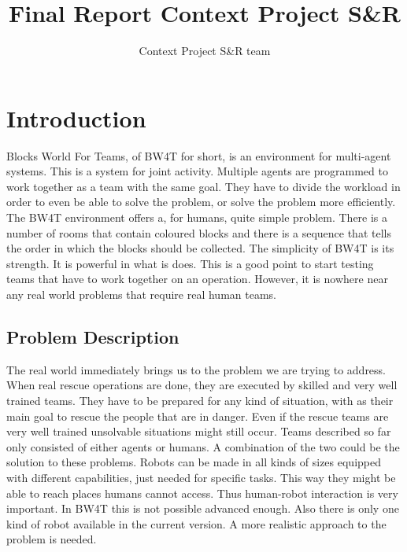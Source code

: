 \documentclass[]{article}
\title{Final Report Context Project S\&R}
\author{Context Project S\&R team}
\begin{document}
\maketitle
\section{Introduction}

Blocks World For Teams, of BW4T for short, is an environment for multi-agent systems. This is a system for joint activity. Multiple agents are programmed to work together as a team with the same goal. They have to divide the workload in order to even be able to solve the problem, or solve the problem more efficiently. The BW4T environment offers a, for humans, quite simple problem. There is a number of rooms that contain coloured blocks and there is a sequence that tells the order in which the blocks should be collected. The simplicity of BW4T is its strength. It is powerful in what is does. This is a good point to start testing teams that have to work together on an operation. However, it is nowhere near any real world problems that require real human teams. 

\subsection{Problem Description}
The real world immediately brings us to the problem we are trying to address. When real rescue operations are done, they are executed by skilled and very well trained teams. They have to be prepared for any kind of situation, with as their main goal to rescue the people that are in danger. Even if the rescue teams are very well trained unsolvable situations might still occur. Teams described so far only consisted of either agents or humans. A combination of the two could be the solution to these problems. Robots can be made in all kinds of sizes equipped with different capabilities, just needed for specific tasks. This way they might be able to reach places humans cannot access. Thus human-robot interaction is very important. In BW4T this is not possible advanced enough. Also there is only one kind of robot available in the current version. A more realistic approach to the problem is needed.
\end{document}
